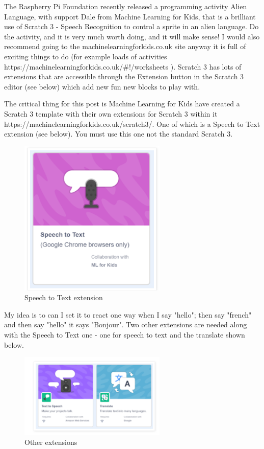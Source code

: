 The Raspberry Pi Foundation recently released a programming activity Alien Language, with support Dale from Machine Learning for Kids, that is a brilliant use of Scratch 3 - Speech Recognition to control a sprite in an alien language. Do the activity, and it is very much worth doing, and it will make sense! I  would also recommend going to the machinelearningforkids.co.uk site anyway it is full of exciting things to do (for example loads of activities https://machinelearningforkids.co.uk/#!/worksheets ). Scratch 3 has lots of extensions that are accessible through the Extension button in the Scratch 3 editor (see below) which add new fun new blocks to play with.




The critical thing for this post is Machine Learning for Kids have created a Scratch 3 template with their own extensions for Scratch 3 within it https://machinelearningforkids.co.uk/scratch3/. One of which is a Speech to Text extension (see below). You must use this one not the standard Scratch 3.

\begin{figure}
    \centering
    \includegraphics[width=7cm]{chapters/chapterCT1/figures/translate2.png}
    \caption{Speech to Text extension}
    \label{fig:speech to text}
\end{figure}


My idea is to can I set it to react one way when I say "hello"; then say "french" and then say "hello" it says "Bonjour". Two other extensions are needed along with the Speech to Text one - one for speech to text and the translate shown below.

\begin{figure}
    \centering
    \includegraphics[width=7cm]{chapters/chapterCT1/figures/translate3.png}
    \caption{Other extensions}
    \label{fig:other_extensions}
\end{figure}


